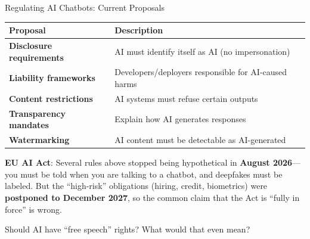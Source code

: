 ﻿\documentclass[aspectratio=169,11pt]{beamer}
\begin{document}
\begin{frame}{Regulating AI Chatbots: Current Proposals}
\begin{table}[h]
\centering
\small
\begin{tabular}{>{\bfseries}l p{7cm}}
\toprule
Proposal & Description \\
\midrule
Disclosure requirements & AI must identify itself as AI (no impersonation) \\
Liability frameworks & Developers/deployers responsible for AI-caused harms \\
Content restrictions & AI systems must refuse certain outputs \\
Transparency mandates & Explain how AI generates responses \\
Watermarking & AI content must be detectable as AI-generated \\
\bottomrule
\end{tabular}
\end{table}

\vspace{0.2cm}
{\small \textbf{EU AI Act}: Several rules above stopped being hypothetical in \textbf{August 2026}---you must be told when you are talking to a chatbot, and deepfakes must be labeled. But the ``high-risk'' obligations (hiring, credit, biometrics) were \textbf{postponed to December 2027}, so the common claim that the Act is ``fully in force'' is wrong.}

\begin{discussionbox}[Discussion]
Should AI have ``free speech'' rights? What would that even mean?
\end{discussionbox}
\end{frame}
\end{document}
